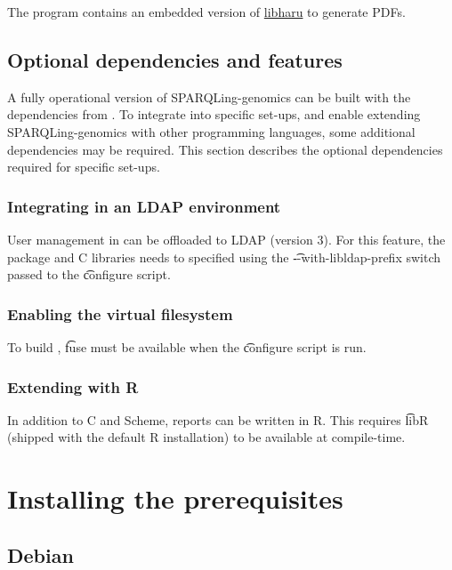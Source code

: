   The  program contains an embedded version of
  \href{https://github.com/libharu/libharu}{libharu} to generate PDFs.

\subsection{Optional dependencies and features}

  A fully operational version of SPARQLing-genomics can be built with the
  dependencies from .  To integrate into specific
  set-ups, and enable extending SPARQLing-genomics with other programming
  languages, some additional dependencies may be required.  This section
  describes the optional dependencies required for specific set-ups.

\subsubsection{Integrating  in an LDAP environment}

  User management in  can be offloaded to LDAP (version 3).
  For this feature, the  package and C libraries needs to
  specified using the \t{-{}-with-libldap-prefix} switch passed to the
  \t{configure} script.

\subsubsection{Enabling the virtual filesystem}

  To build , \t{fuse} must be available when the \t{configure}
  script is run.

\subsubsection{Extending  with R}

  In addition to C and Scheme, reports can be written in R.  This requires
  \t{libR} (shipped with the default R installation) to be available at
  compile-time.

\section{Installing the prerequisites}

\subsection{Debian}

